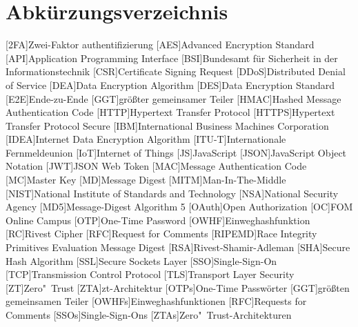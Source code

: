 \section*{Abkürzungsverzeichnis}


\begin{acronym}
[RIPEMD]\itemsep0pt %
[2FA]{Zwei-Faktor \gls{authentifizierung}}
[AES]{Advanced Encryption Standard}
[API]{Application Programming Interface}
[BSI]{Bundesamt für Sicherheit in der Informationstechnik}
[CSR]{Certificate Signing Request}
[DDoS]{Distributed Denial of Service}
[DEA]{Data Encryption Algorithm}
[DES]{Data Encryption Standard}
[E2E]{Ende-zu-Ende}
[GGT]{größter gemeinsamer Teiler}
[HMAC]{Hashed Message Authentication Code}
[HTTP]{Hypertext Transfer Protocol}
[\acs{HTTP}S]{Hypertext Transfer Protocol Secure}
[IBM]{International Business Machines Corporation}
[IDEA]{Internet Data Encryption Algorithm}
[ITU-T]{Internationale Fernmeldeunion}
[IoT]{Internet of Things}
[JS]{JavaScript}
[JSON]{JavaScript Object Notation}
[JWT]{JSON Web Token}
[MAC]{Message Authentication Code}
[MC]{Master Key}
[MD]{Message Digest}
[MITM]{Man-In-The-Middle}
[NIST]{National Institute of Standards and Technology}
[NSA]{National Security Agency}
[MD5]{Message-Digest Algorithm 5}
[OAuth]{Open Authorization}
[OC]{FOM Online Campus}
[OTP]{One-Time Password}
[OWHF]{Einweghashfunktion}
[RC]{Rivest Cipher}
[RFC]{Request for Comments}
[RIPEMD]{Race Integrity Primitives Evaluation Message Digest}
[RSA]{Rivest-Shamir-Adleman}
[SHA]{Secure Hash Algorithm}
[SSL]{Secure Sockets Layer}
[SSO]{Single-Sign-On}
[TCP]{Transmission Control Protocol}
[TLS]{Transport Layer Security}
[ZT]{Zero"~Trust}
[ZTA]{\acl{zt}-Architektur}
[OTPs]{One-Time Passwörter}
[GGT]{größten gemeinsamen Teiler}
[OWHFs]{Einweghashfunktionen}
[RFC]{Requests for Comments}
[SSOs]{Single-Sign-Ons}
[ZTAs]{Zero"~Trust-Architekturen}
\end{acronym}